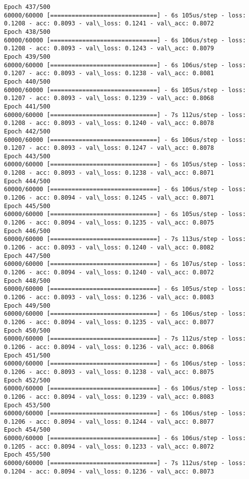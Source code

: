 \documentclass[11pt]{article}
\begin{document}
\begin{Verbatim}[commandchars=\\\{\}]
Epoch 437/500
60000/60000 [==============================] - 6s 105us/step - loss: 0.1208 - acc: 0.8093 - val\_loss: 0.1241 - val\_acc: 0.8072
Epoch 438/500
60000/60000 [==============================] - 6s 106us/step - loss: 0.1208 - acc: 0.8093 - val\_loss: 0.1243 - val\_acc: 0.8079
Epoch 439/500
60000/60000 [==============================] - 6s 106us/step - loss: 0.1207 - acc: 0.8093 - val\_loss: 0.1238 - val\_acc: 0.8081
Epoch 440/500
60000/60000 [==============================] - 6s 105us/step - loss: 0.1207 - acc: 0.8093 - val\_loss: 0.1239 - val\_acc: 0.8068
Epoch 441/500
60000/60000 [==============================] - 7s 112us/step - loss: 0.1208 - acc: 0.8093 - val\_loss: 0.1240 - val\_acc: 0.8078
Epoch 442/500
60000/60000 [==============================] - 6s 106us/step - loss: 0.1207 - acc: 0.8093 - val\_loss: 0.1247 - val\_acc: 0.8078
Epoch 443/500
60000/60000 [==============================] - 6s 105us/step - loss: 0.1208 - acc: 0.8093 - val\_loss: 0.1238 - val\_acc: 0.8071
Epoch 444/500
60000/60000 [==============================] - 6s 106us/step - loss: 0.1206 - acc: 0.8094 - val\_loss: 0.1245 - val\_acc: 0.8071
Epoch 445/500
60000/60000 [==============================] - 6s 105us/step - loss: 0.1206 - acc: 0.8094 - val\_loss: 0.1235 - val\_acc: 0.8075
Epoch 446/500
60000/60000 [==============================] - 7s 113us/step - loss: 0.1206 - acc: 0.8093 - val\_loss: 0.1240 - val\_acc: 0.8082
Epoch 447/500
60000/60000 [==============================] - 6s 107us/step - loss: 0.1206 - acc: 0.8094 - val\_loss: 0.1240 - val\_acc: 0.8072
Epoch 448/500
60000/60000 [==============================] - 6s 105us/step - loss: 0.1206 - acc: 0.8093 - val\_loss: 0.1236 - val\_acc: 0.8083
Epoch 449/500
60000/60000 [==============================] - 6s 106us/step - loss: 0.1206 - acc: 0.8094 - val\_loss: 0.1235 - val\_acc: 0.8077
Epoch 450/500
60000/60000 [==============================] - 7s 112us/step - loss: 0.1206 - acc: 0.8094 - val\_loss: 0.1236 - val\_acc: 0.8068
Epoch 451/500
60000/60000 [==============================] - 6s 106us/step - loss: 0.1206 - acc: 0.8093 - val\_loss: 0.1238 - val\_acc: 0.8075
Epoch 452/500
60000/60000 [==============================] - 6s 106us/step - loss: 0.1206 - acc: 0.8094 - val\_loss: 0.1239 - val\_acc: 0.8083
Epoch 453/500
60000/60000 [==============================] - 6s 106us/step - loss: 0.1206 - acc: 0.8094 - val\_loss: 0.1244 - val\_acc: 0.8077
Epoch 454/500
60000/60000 [==============================] - 6s 106us/step - loss: 0.1205 - acc: 0.8094 - val\_loss: 0.1233 - val\_acc: 0.8072
Epoch 455/500
60000/60000 [==============================] - 7s 112us/step - loss: 0.1204 - acc: 0.8094 - val\_loss: 0.1236 - val\_acc: 0.8073

\end{Verbatim}
\end{document}
